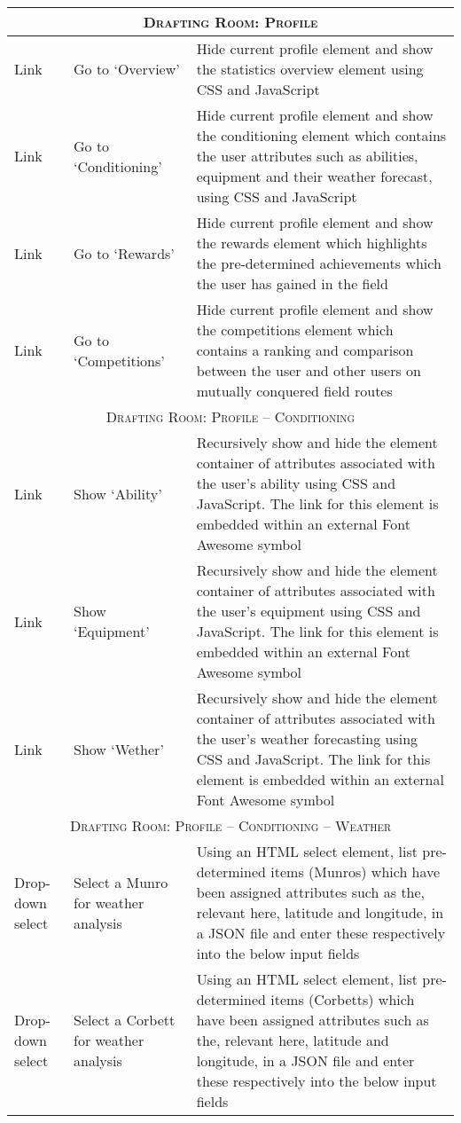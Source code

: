 \documentclass[11pt, english]{article}
\begin{document}
\begin{center}
\begin{longtable}{p{3cm}lp{6cm}}
		\hline
		\multicolumn{3}{c}{\textsc{Drafting Room: Profile}}\\
		\hline
		Link & Go to `Overview' & Hide current profile element and show the statistics overview element using CSS and JavaScript\\
		Link & Go to `Conditioning' & Hide current profile element and show the conditioning element which contains the user attributes such as abilities, equipment and their weather forecast, using CSS and JavaScript\\
		Link & Go to `Rewards' & Hide current profile element and show the rewards element which highlights the pre-determined achievements which the user has gained in the field\\
		Link & Go to `Competitions' & Hide current profile element and show the competitions element which contains a ranking and comparison between the user and other users on mutually conquered field routes\\
		\hline
		\multicolumn{3}{c}{\textsc{Drafting Room: Profile -- Conditioning}}\\
		\hline
		Link & Show `Ability' & Recursively show and hide the element container of attributes associated with the user's ability using CSS and JavaScript. The link for this element is embedded within an external Font Awesome symbol\\
		Link & Show `Equipment' & Recursively show and hide the element container of attributes associated with the user's equipment using CSS and JavaScript. The link for this element is embedded within an external Font Awesome symbol\\
		Link & Show `Wether' & Recursively show and hide the element container of attributes associated with the user's weather forecasting using CSS and JavaScript. The link for this element is embedded within an external Font Awesome symbol\\
		\hline
		\multicolumn{3}{c}{\textsc{Drafting Room: Profile -- Conditioning -- Weather}}\\
		\hline
		Drop-down select & Select a Munro for weather analysis & Using an HTML select element, list pre-determined items (Munros) which have been assigned attributes such as the, relevant here, latitude and longitude, in a JSON file and enter these respectively into the below input fields\\
		Drop-down select & Select a Corbett for weather analysis & Using an HTML select element, list pre-determined items (Corbetts) which have been assigned attributes such as the, relevant here, latitude and longitude, in a JSON file and enter these respectively into the below input fields\\

\end{longtable}
\end{center}
\end{document}
